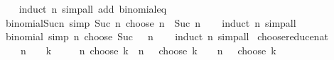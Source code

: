 \begin{isabellebody}
%
\isadelimproof
\ \ %
\endisadelimproof
%
\isatagproof
{}\isamarkupfalse%
\ {\isacharparenleft}{\kern0pt}induct\ n{\isacharparenright}{\kern0pt}\ {\isacharparenleft}{\kern0pt}simp{\isacharunderscore}{\kern0pt}all\ add{\isacharcolon}{\kern0pt}\ binomial{\isacharunderscore}{\kern0pt}eq{\isacharunderscore}{\kern0pt}{}{\isacharparenright}{\kern0pt}%
\endisatagproof
{\isafoldproof}%
%
\isadelimproof
\isanewline
%
\endisadelimproof
\isanewline
{}\isamarkupfalse%
\ binomial{\isacharunderscore}{\kern0pt}Suc{\isacharunderscore}{\kern0pt}n\ {\isacharbrackleft}{\kern0pt}simp{\isacharbrackright}{\kern0pt}{\isacharcolon}{\kern0pt}\ {\isachardoublequoteopen}Suc\ n\ choose\ n\ {\isacharequal}{\kern0pt}\ Suc\ n{\isachardoublequoteclose}\isanewline
%
\isadelimproof
\ \ %
\endisadelimproof
%
\isatagproof
{}\isamarkupfalse%
\ {\isacharparenleft}{\kern0pt}induct\ n{\isacharparenright}{\kern0pt}\ simp{\isacharunderscore}{\kern0pt}all%
\endisatagproof
{\isafoldproof}%
%
\isadelimproof
\isanewline
%
\endisadelimproof
\isanewline
{}\isamarkupfalse%
\ binomial{\isacharunderscore}{\kern0pt}{}\ {\isacharbrackleft}{\kern0pt}simp{\isacharbrackright}{\kern0pt}{\isacharcolon}{\kern0pt}\ {\isachardoublequoteopen}n\ choose\ Suc\ {}\ {\isacharequal}{\kern0pt}\ n{\isachardoublequoteclose}\isanewline
%
\isadelimproof
\ \ %
\endisadelimproof
%
\isatagproof
{}\isamarkupfalse%
\ {\isacharparenleft}{\kern0pt}induct\ n{\isacharparenright}{\kern0pt}\ simp{\isacharunderscore}{\kern0pt}all%
\endisatagproof
{\isafoldproof}%
%
\isadelimproof
\isanewline
%
\endisadelimproof
\isanewline
{}\isamarkupfalse%
\ choose{\isacharunderscore}{\kern0pt}reduce{\isacharunderscore}{\kern0pt}nat{\isacharcolon}{\kern0pt}\isanewline
\ \ {\isachardoublequoteopen}{}\ {\isacharless}{\kern0pt}\ n\ {\isasymLongrightarrow}\ {}\ {\isacharless}{\kern0pt}\ k\ {\isasymLongrightarrow}\isanewline
\ \ \ \ n\ choose\ k\ {\isacharequal}{\kern0pt}\ {\isacharparenleft}{\kern0pt}{\isacharparenleft}{\kern0pt}n\ {\isacharminus}{\kern0pt}\ {}{\isacharparenright}{\kern0pt}\ choose\ {\isacharparenleft}{\kern0pt}k\ {\isacharminus}{\kern0pt}\ {}{\isacharparenright}{\kern0pt}{\isacharparenright}{\kern0pt}\ {\isacharplus}{\kern0pt}\ {\isacharparenleft}{\kern0pt}{\isacharparenleft}{\kern0pt}n\ {\isacharminus}{\kern0pt}\ {}{\isacharparenright}{\kern0pt}\ choose\ k{\isacharparenright}{\kern0pt}{\isachardoublequoteclose}\isanewline
%
\isadelimproof
\ \ %
\endisadelimproof

\end{isabellebody}
